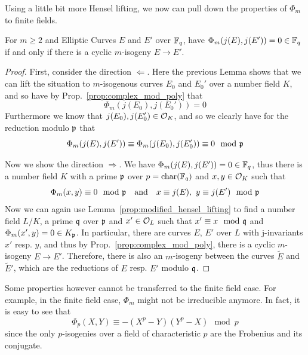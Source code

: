 Using a little bit more Hensel lifting, we now can pull down the properties of $\Phi_m$ to finite fields.
\begin{prop}
    For $m \geq 2$ and Elliptic Curves $E$ and $E'$ over $\mathbb{F}_q$, have $\Phi_m(j(E), j(E')) = 0 \in \mathbb{F}_q$ if and only if there is a cyclic $m$-isogeny $E \to E'$.
\end{prop}
\begin{proof}
    First, consider the direction $\Leftarrow$.
    Here the previous Lemma shows that we can lift the situation to $m$-isogenous curves $E_0$ and $E_0'$ over a number field $K$, and so have by Prop.~\ref{prop:complex_mod_poly} that
    \begin{equation*}
        \Phi_m(j(E_0), j(E_0')) = 0
    \end{equation*}
    Furthermore we know that $j(E_0), j(E_0') \in \mathcal{O}_K$, and so we clearly have for the reduction modulo $\mathfrak{p}$ that
    \begin{equation*}
        \Phi_m(j(E), j(E')) \equiv \Phi_m(j(E_0), j(E_0')) \equiv 0 \mod {\mathfrak{p}}
    \end{equation*}

    Now we show the direction $\Rightarrow$.
    We have $\Phi_m(j(E), j(E')) = 0 \in \mathbb{F}_q$, thus there is a number field $K$ with a prime $\mathfrak{p}$ over $p = \mathrm{char}(\mathbb{F}_q)$ and $x, y \in \mathcal{O}_K$ such that
    \begin{equation*}
        \Phi_m(x, y) \equiv 0 \mod {\mathfrak{p}} \quad \text{and} \quad x \equiv j(E), \ y \equiv j(E') \mod {\mathfrak{p}}
    \end{equation*}
    Now we can again use Lemma~\ref{prop:modified_hensel_lifting} to find a number field $L/K$, a prime $\mathfrak{q}$ over $\mathfrak{p}$ and $x' \in \mathcal{O}_L$ such that $x' \equiv x \mod {\mathfrak{q}}$ and $\Phi_m(x', y) = 0 \in K_{\mathfrak{p}}$.
    In particular, there are curves $E$, $E'$ over $L$ with j-invariants $x'$ resp. $y$, and thus by Prop.~\ref{prop:complex_mod_poly}, there is a cyclic $m$-isogeny $E \to E'$.
    Therefore, there is also an $m$-isogeny between the curves $\tilde{E}$ and $\tilde{E}'$, which are the reductions of $E$ resp. $E'$ modulo $\mathfrak{q}$.
\end{proof}
Some properties however cannot be transferred to the finite field case.
For example, in the finite field case, $\Phi_m$ might not be irreducible anymore.
In fact, it is easy to see that
\begin{equation*}
    \Phi_p(X, Y) \equiv -(X^p - Y)(Y^p - X) \mod p
\end{equation*}
since the only $p$-isogenies over a field of characteristic $p$ are the Frobenius and its conjugate.

